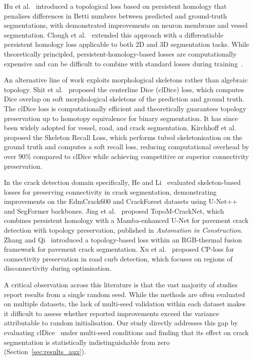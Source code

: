 \documentclass[preprint,12pt]{elsarticle}
\begin{document}
Hu et al.~\cite{hu2019topology} introduced a topological loss based on persistent homology that penalises differences in Betti numbers between predicted and ground-truth segmentations, with demonstrated improvements on neuron membrane and vessel segmentation. Clough et al.~\cite{clough2020topological} extended this approach with a differentiable persistent homology loss applicable to both 2D and 3D segmentation tasks. While theoretically principled, persistent-homology-based losses are computationally expensive and can be difficult to combine with standard losses during training~\cite{hu2021topology}.

An alternative line of work exploits morphological skeletons rather than algebraic topology. Shit et al.~\cite{shit2021cldice} proposed the centerline Dice (clDice) loss, which computes Dice overlap on soft morphological skeletons of the prediction and ground truth. The clDice loss is computationally efficient and theoretically guarantees topology preservation up to homotopy equivalence for binary segmentation. It has since been widely adopted for vessel, road, and crack segmentation. Kirchhoff et al.~\cite{kirchhoff2024skeleton} proposed the Skeleton Recall Loss, which performs tubed skeletonisation on the ground truth and computes a soft recall loss, reducing computational overhead by over 90\% compared to clDice while achieving competitive or superior connectivity preservation.

In the crack detection domain specifically, He and Li~\cite{he2024beyond} evaluated skeleton-based losses for preserving connectivity in crack segmentation, demonstrating improvements on the EdmCrack600 and CrackForest datasets using U-Net++ and SegFormer backbones. Jing et al.~\cite{jing2025topology} proposed TopoM-CrackNet, which combines persistent homology with a Mamba-enhanced U-Net for pavement crack detection with topology preservation, published in \textit{Automation in Construction}. Zhang and Qi~\cite{zhang2024irfusionformer} introduced a topology-based loss within an RGB-thermal fusion framework for pavement crack segmentation. Xu et al.~\cite{xu2021cploss} proposed CP-loss for connectivity preservation in road curb detection, which focuses on regions of disconnectivity during optimisation.

A critical observation across this literature is that the vast majority of studies report results from a single random seed. While the methods are often evaluated on multiple datasets, the lack of multi-seed validation within each dataset makes it difficult to assess whether reported improvements exceed the variance attributable to random initialisation. Our study directly addresses this gap by evaluating clDice~\cite{shit2021cldice} under multi-seed conditions and finding that its effect on crack segmentation is statistically indistinguishable from zero (Section~\ref{sec:results_aux}).
\end{document}
